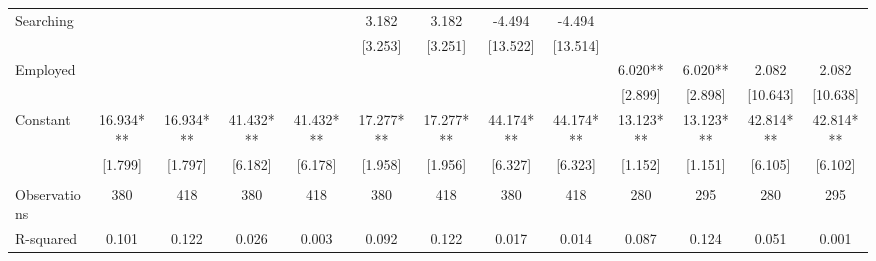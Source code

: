 \begin{tabular}{lcccccccccccc}
Searching &  &  &  &  & 3.182 & 3.182 & -4.494 & -4.494 &  &  &  &  \\
 &  &  &  &  & [3.253] & [3.251] & [13.522] & [13.514] &  &  &  &  \\
Employed &  &  &  &  &  &  &  &  & 6.020** & 6.020** & 2.082 & 2.082 \\
 &  &  &  &  &  &  &  &  & [2.899] & [2.898] & [10.643] & [10.638] \\
Constant & 16.934*** & 16.934*** & 41.432*** & 41.432*** & 17.277*** & 17.277*** & 44.174*** & 44.174*** & 13.123*** & 13.123*** & 42.814*** & 42.814*** \\
 & [1.799] & [1.797] & [6.182] & [6.178] & [1.958] & [1.956] & [6.327] & [6.323] & [1.152] & [1.151] & [6.105] & [6.102] \\
 &  &  &  &  &  &  &  &  &  &  &  &  \\
Observations & 380 & 418 & 380 & 418 & 380 & 418 & 380 & 418 & 280 & 295 & 280 & 295 \\
 R-squared & 0.101 & 0.122 & 0.026 & 0.003 & 0.092 & 0.122 & 0.017 & 0.014 & 0.087 & 0.124 & 0.051 & 0.001 \\ \hline
\end{tabular}
